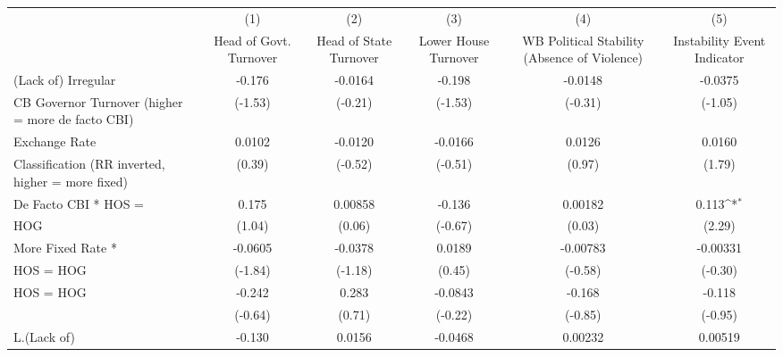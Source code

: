 {
\def\sym#1{\ifmmode^{#1}\else\(^{#1}\)\fi}
\begin{tabular}{l*{5}{c}}
\hline\hline
                    &\multicolumn{1}{c}{(1)}&\multicolumn{1}{c}{(2)}&\multicolumn{1}{c}{(3)}&\multicolumn{1}{c}{(4)}&\multicolumn{1}{c}{(5)}\\
                    &\multicolumn{1}{c}{Head of Govt. Turnover}&\multicolumn{1}{c}{Head of State Turnover}&\multicolumn{1}{c}{Lower House Turnover}&\multicolumn{1}{c}{WB Political Stability (Absence of Violence)}&\multicolumn{1}{c}{Instability Event Indicator}\\
\hline
(Lack of) Irregular &      -0.176         &     -0.0164         &      -0.198         &     -0.0148         &     -0.0375         \\
CB Governor Turnover (higher = more de facto CBI)&     (-1.53)         &     (-0.21)         &     (-1.53)         &     (-0.31)         &     (-1.05)         \\
[1em]
Exchange Rate       &      0.0102         &     -0.0120         &     -0.0166         &      0.0126         &      0.0160         \\
Classification (RR inverted, higher = more fixed)&      (0.39)         &     (-0.52)         &     (-0.51)         &      (0.97)         &      (1.79)         \\
[1em]
De Facto CBI * HOS =&       0.175         &     0.00858         &      -0.136         &     0.00182         &       0.113\sym{*}  \\
HOG                 &      (1.04)         &      (0.06)         &     (-0.67)         &      (0.03)         &      (2.29)         \\
[1em]
More Fixed Rate *   &     -0.0605         &     -0.0378         &      0.0189         &    -0.00783         &    -0.00331         \\
HOS = HOG           &     (-1.84)         &     (-1.18)         &      (0.45)         &     (-0.58)         &     (-0.30)         \\
[1em]
HOS = HOG           &      -0.242         &       0.283         &     -0.0843         &      -0.168         &      -0.118         \\
                    &     (-0.64)         &      (0.71)         &     (-0.22)         &     (-0.85)         &     (-0.95)         \\
[1em]
L.(Lack of)         &      -0.130         &      0.0156         &     -0.0468         &     0.00232         &     0.00519         \\

\end{tabular}}
